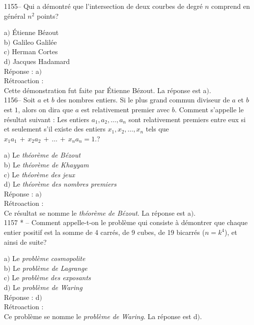 ﻿\documentclass[letterpaper, 12pt]{article}
\begin{document}
1155-- Qui a d\'emontr\'e que l'intersection de deux courbes de
degr\'e $n$ comprend en g\'en\'eral $n^2$ points?

a$)$ \'Etienne B\'ezout \\
b$)$ Galileo Galil\'ee \\
c$)$ Herman Cortes \\
d$)$ Jacques Hadamard\\

R\'eponse : a$)$\\

R\'etroaction : \\
Cette d\'emonstration fut faite par \'Etienne B\'ezout. La r\'eponse est
a$)$.\\

1156-- Soit $a$ et $b$ des nombres entiers. Si le plus grand commun
diviseur de $a$ et $b$ est $1$, alors on dira que $a$ est
relativement premier avec $b$. Comment s'appelle le r\'esultat
suivant : \og Les entiers $a_1,a_2,\ldots,a_n$ sont relativement
premiers entre eux si et seulement s'il existe des entiers
$x_1,x_2,\ldots,x_n$ tels que
$x_1a_1\,+\,x_2a_2\,+\,\ldots\,+\,x_na_n=1.$\fg ?

a$)$ Le {\sl th\'eor\`eme de B\'ezout} \\
b$)$ Le {\sl th\'eor\`eme de Khayyam} \\
c$)$ Le {\sl th\'eor\`eme des jeux} \\
d$)$ Le {\sl th\'eor\`eme des nombres premiers}\\

R\'eponse : a$)$\\

R\'etroaction : \\
Ce r\'esultat se nomme le {\sl th\'eor\`eme de B\'ezout}. La r\'eponse est
a$)$.\\

1157 * -- Comment appelle-t-on le probl\`eme qui consiste \`a
d\'emontrer que chaque entier positif est la somme de 4 carr\'es, de
9 cubes, de 19 bicarr\'es ($n=k^4$), et ainsi de suite?

a$)$ Le {\sl probl\`eme cosmopolite} \\
b$)$ Le {\sl probl\`eme de Lagrange} \\
c$)$ Le {\sl probl\`eme des exposants} \\
d$)$ Le {\sl probl\`eme de Waring}\\

R\'eponse : d$)$\\

R\'etroaction : \\
Ce probl\`eme se nomme le {\sl probl\`eme de Waring}. La r\'eponse est
d$)$.\\
\end{document}
